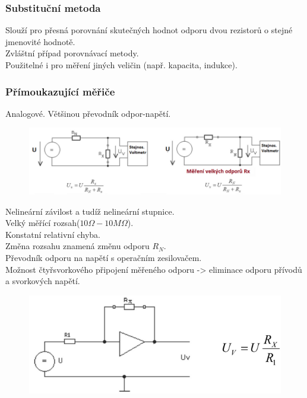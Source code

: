 \subsubsection{Substituční metoda}
Slouží pro přesná porovnání skutečných hodnot odporu dvou rezistorů o stejné jmenovité hodnotě.\\
Zvláštní případ porovnávací metody.\\
Použitelné i pro měření jiných veličin (např. kapacita, indukce).\\

\subsubsection{Přímoukazující měřiče}
Analogové. Většinou převodník odpor-napětí.\\
\begin{figure}[h!]
    \centering
    \includegraphics[scale = 0.6]{images/Primouk1.png}
\end{figure}

Nelineární závilost a tudíž nelineární stupnice.\\
Velký měřící rozsah(\(10\Omega - 10M\Omega\)).\\
Konstatní relativní chyba.\\
Změna rozsahu znamená změnu odporu \(R_N\).\\
Převodník odporu na napětí s operačním zesilovačem.\\
Možnost čtyřsvorkového připojení měřeného odporu -> eliminace odporu přívodů a svorkových napětí.
\begin{figure}
    \centering
    \includegraphics[scale = 0.6]{images/Primouk2.png}
\end{figure}


